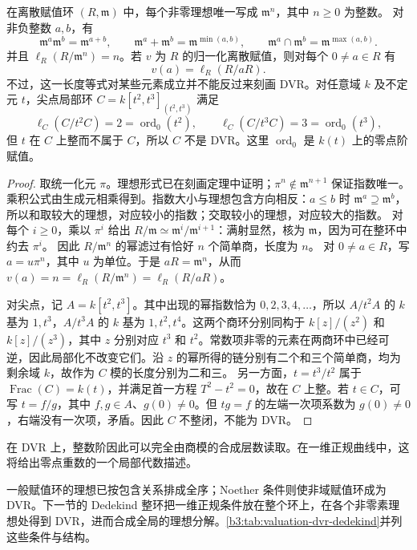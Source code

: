\begin{proposition}\label{b3:prop:dvr-order-ideals}
	在离散赋值环 \((R,\mathfrak m)\) 中，每个非零理想唯一写成 \(\mathfrak m^n\)，其中 \(n\ge0\) 为整数。 对非负整数 \(a,b\)，有
	\[
		\mathfrak m^a\mathfrak m^b=\mathfrak m^{a+b},\qquad \mathfrak m^a+\mathfrak m^b=\mathfrak m^{\min(a,b)},\qquad \mathfrak m^a\cap\mathfrak m^b=\mathfrak m^{\max(a,b)}.
	\]
	并且 \(\ell_R(R/\mathfrak m^n)=n\)。若 \(v\) 为 \(R\) 的归一化离散赋值，则对每个 \(0\ne a\in R\) 有
	\[
		v(a)=\ell_R(R/aR).
	\]
	不过，这一长度等式对某些元素成立并不能反过来刻画 DVR。对任意域 \(k\) 及不定元 \(t\)，尖点局部环 \(C=k[t^2,t^3]_{(t^2,t^3)}\) 满足
	\[
		\ell_C(C/t^2C)=2=\operatorname{ord}_0(t^2),\qquad \ell_C(C/t^3C)=3=\operatorname{ord}_0(t^3),
	\]
	但 \(t\) 在 \(C\) 上整而不属于 \(C\)，所以 \(C\) 不是 DVR。这里 \(\operatorname{ord}_0\) 是 \(k(t)\) 上的零点阶赋值。
\end{proposition}
\begin{proof}
	取统一化元 \(\pi\)。理想形式已在刻画定理中证明；\(\pi^n\notin\mathfrak m^{n+1}\) 保证指数唯一。 乘积公式由生成元相乘得到。指数大小与理想包含方向相反：\(a\le b\) 时 \(\mathfrak m^a\supseteq\mathfrak m^b\)，所以和取较大的理想，对应较小的指数；交取较小的理想，对应较大的指数。 对每个 \(i\ge0\)，乘以 \(\pi^i\) 给出 \(R/\mathfrak m\simeq\mathfrak m^i/\mathfrak m^{i+1}\)：满射显然，核为 \(\mathfrak m\)，因为可在整环中约去 \(\pi^i\)。 因此 \(R/\mathfrak m^n\) 的幂滤过有恰好 \(n\) 个简单商，长度为 \(n\)。 对 \(0\ne a\in R\)，写 \(a=u\pi^n\)，其中 \(u\) 为单位。于是 \(aR=\mathfrak m^n\)，从而 \(v(a)=n=\ell_R(R/\mathfrak m^n)=\ell_R(R/aR)\)。

	对尖点，记 \(A=k[t^2,t^3]\)。其中出现的幂指数恰为 \(0,2,3,4,\ldots\)，所以 \(A/t^2A\) 的 \(k\) 基为 \(1,t^3\)，\(A/t^3A\) 的 \(k\) 基为 \(1,t^2,t^4\)。这两个商环分别同构于 \(k[z]/(z^2)\) 和 \(k[z]/(z^3)\)，其中 \(z\) 分别对应 \(t^3\) 和 \(t^2\)。常数项非零的元素在两商环中已经可逆，因此局部化不改变它们。沿 \(z\) 的幂所得的链分别有二个和三个简单商，均为剩余域 \(k\)，故作为 \(C\) 模的长度分别为二和三。 另一方面，\(t=t^3/t^2\) 属于 \(\operatorname{Frac}(C)=k(t)\)，并满足首一方程 \(T^2-t^2=0\)，故在 \(C\) 上整。若 \(t\in C\)，可写 \(t=f/g\)，其中 \(f,g\in A\)、\(g(0)\ne0\)。但 \(tg=f\) 的左端一次项系数为 \(g(0)\ne0\)，右端没有一次项，矛盾。因此 \(C\) 不整闭，不能为 DVR。
\end{proof}

在 DVR 上，整数阶因此可以完全由商模的合成层数读取。在一维正规曲线中，这将给出零点重数的一个局部代数描述。

\ProseParagraphBreak
一般赋值环的理想已按包含关系排成全序；Noether 条件则使非域赋值环成为 DVR。下一节的 Dedekind 整环把一维正规条件放在整个环上，在各个非零素理想处得到 DVR，进而合成全局的理想分解。\cref{b3:tab:valuation-dvr-dedekind}并列这些条件与结构。

